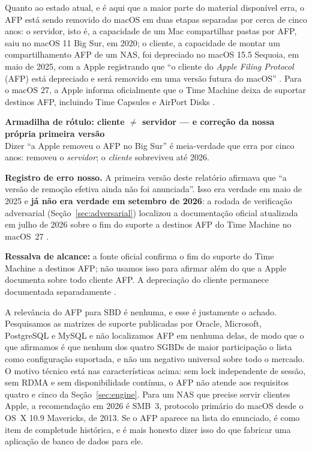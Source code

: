 \documentclass[11pt,a4paper]{article}
\newcommand{\correcao}[2]{%
  \begin{center}\begin{minipage}{0.96\textwidth}
  \colorbox{fundo}{\begin{minipage}{\dimexpr\linewidth-2\fboxsep}
  \vspace{2pt}\textbf{\color{laranja}\small #1}\\[1pt]\footnotesize #2\vspace{3pt}
  \end{minipage}}\end{minipage}\end{center}}
\begin{document}
Quanto ao estado atual, e é aqui que a maior parte do material disponível erra, o AFP está sendo
removido do macOS em duas etapas separadas por cerca de cinco anos: o servidor, isto é, a capacidade
de um Mac compartilhar pastas por AFP, saiu no macOS 11 Big Sur, em 2020; o cliente, a capacidade de
montar um compartilhamento AFP de um NAS, foi depreciado no macOS 15.5 Sequoia, em maio de 2025, com
a Apple registrando que ``o cliente do \textit{Apple Filing Protocol} (AFP) está depreciado e será
removido em uma versão futura do macOS'' \cite{appleafp}. Para o macOS 27, a Apple informa
oficialmente que o Time Machine deixa de suportar destinos AFP, incluindo Time Capsules e AirPort
Disks \cite{appleafptm}.

\correcao{Armadilha de rótulo: cliente $\neq$ servidor --- e correção da nossa própria primeira versão}{%
Dizer ``a Apple removeu o AFP no Big Sur'' é meia-verdade que erra por cinco anos: removeu o
\emph{servidor}; o \emph{cliente} sobreviveu até 2026.

\smallskip
\textbf{Registro de erro nosso.} A primeira versão deste relatório afirmava que ``a versão de
remoção efetiva ainda não foi anunciada''. Isso era verdade em maio de 2025 e \textbf{já não era
verdade em setembro de 2026}: a rodada de verificação adversarial (Seção~\ref{sec:adversarial})
localizou a documentação oficial atualizada em julho de 2026 sobre o fim do suporte a
destinos AFP do Time Machine no macOS~27 \cite{appleafptm}.

\smallskip
\textbf{Ressalva de alcance:} a fonte oficial confirma o fim do suporte do Time Machine a
destinos AFP; não usamos isso para afirmar além do que a Apple documenta sobre todo cliente AFP.
A depreciação do cliente permanece documentada separadamente \cite{appleafp}.}

A relevância do AFP para SBD é nenhuma, e esse é justamente o achado. Pesquisamos as matrizes de
suporte publicadas por Oracle, Microsoft, PostgreSQL e MySQL e não localizamos AFP em nenhuma delas,
de modo que o que afirmamos é que nenhum dos quatro SGBDs de maior participação o lista como
configuração suportada, e não um negativo universal sobre todo o mercado. O motivo técnico está nas
características acima: sem lock independente de sessão, sem RDMA e sem disponibilidade
contínua, o AFP não atende aos requisitos quatro e cinco da Seção~\ref{sec:engine}. Para um NAS que
precise servir clientes Apple, a recomendação em 2026 é SMB~3, protocolo primário do macOS desde o
OS~X 10.9 Mavericks, de 2013. Se o AFP aparece na lista do enunciado, é como item de completude
histórica, e é mais honesto dizer isso do que fabricar uma aplicação de banco de dados para ele.
\end{document}
